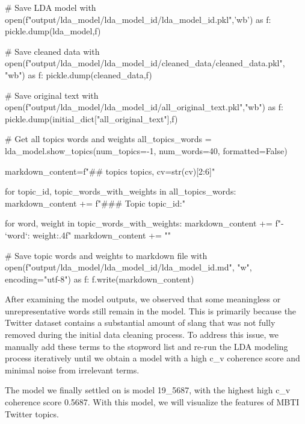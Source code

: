 \documentclass[12pt]{article}
\begin{document}
\begin{python}
# Save LDA model
with open(f"output/lda_model/lda_{model_id}/lda_{model_id}.pkl",'wb') as f:
    pickle.dump(lda_model,f)

# Save cleaned data
with open(f"output/lda_model/lda_{model_id}/cleaned_data/cleaned_data.pkl", "wb") as f:
    pickle.dump(cleaned_data,f)

# Save original text
with open(f"output/lda_model/lda_{model_id}/all_original_text.pkl","wb") as f:
        pickle.dump(initial_dict["all_original_text"],f)
        
# Get all topics words and weights
all_topics_words = lda_model.show_topics(num_topics=-1, num_words=40, formatted=False)

markdown_content=f"## {topics} topics, cv={str(cv)[2:6]}\n\n"

for topic_id, topic_words_with_weights in all_topics_words:
        markdown_content += f"### Topic {topic_id}:\n" 
        
        
        for word, weight in topic_words_with_weights:
            markdown_content += f"- `{word}`: {weight:.4f}\n"
        markdown_content += "\n" 

# Save topic words and weights to markdown file
with open(f"output/lda_model/lda_{model_id}/lda_{model_id}.md", "w", encoding="utf-8") as f:
        f.write(markdown_content)
	\end{python}
	
	After examining the model outputs, we observed that some meaningless or unrepresentative words still remain in the model. This is primarily because the Twitter dataset contains a substantial amount of slang that was not fully removed during the initial data cleaning process. To address this issue, we manually add these terms to the stopword list and re-run the LDA modeling process iteratively until we obtain a model with a high c\_v coherence score and minimal noise from irrelevant terms.
	
	The model we finally settled on is model 19\_5687, with the highest high c\_v coherence score 0.5687. With this model, we will visualize the features of MBTI Twitter topics.
	
	
\end{document}
